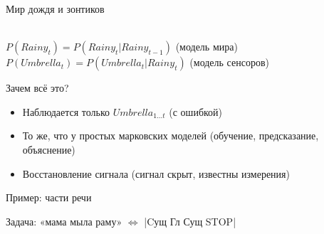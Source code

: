 \documentclass[10pt]{beamer}
\begin{document}
\begin{frame}{Мир дождя и зонтиков}
  \begin{center}
  \\
  \vspace{1em}
  $P(Rainy_t)=P(Rainy_t|Rainy_{t-1})$ (модель мира)\\
  $P(Umbrella_t)=P(Umbrella_t|Rainy_t)$ (модель сенсоров)\\
  \vspace{1em}
  \end{center}
  Зачем всё это?
  \begin{itemize}
  \item Наблюдается только $Umbrella_{1 \dots t}$ (с ошибкой)
  \item То же, что у простых марковских моделей (обучение,
    предсказание, объяснение)
  \item Восстановление сигнала (сигнал скрыт, известны измерения)
  \end{itemize}
\end{frame}

\begin{frame}{Пример: части речи}
  \begin{center}
    \large
    Задача: «мама мыла раму» $\iff$ |Cущ Гл Сущ STOP|
  \end{center}
\end{frame}
\end{document}
